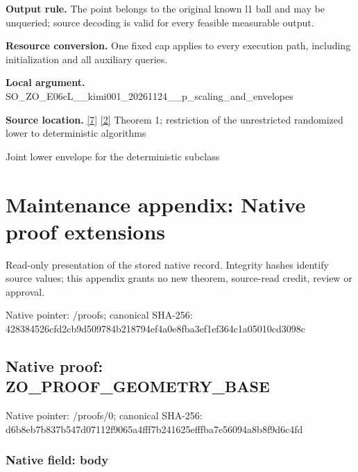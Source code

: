 \documentclass[10pt,a4paper]{article}
\begin{document}
\textbf{Output rule.} The point belongs to the original known l1 ball and may be unqueried; source decoding is valid for every feasible measurable output.



\textbf{Resource conversion.} One fixed cap applies to every execution path, including initialization and all auxiliary queries.



\textbf{Local argument.} SO\_ZO\_E06cL\_\_kimi001\_202\allowbreak{}61124\_\_p\_scaling\_and\_env\allowbreak{}elopes



\textbf{Source location.} \href{https://github.com/WU-Wendao/Colombo/blob/main/colombo_sensorium/Complexity_altas/data/sources/colombo/COLOMBO_KIMI_001/kimi_001.pdf}{[7]} \href{https://arxiv.org/html/2607.16558v2}{[2]} Theorem 1; restriction of the unrestricted randomized lower to deterministic algorithms



Joint lower envelope for the deterministic subclass



\section{Maintenance appendix: Native proof extensions}


Read-only presentation of the stored native record. Integrity hashes identify source values; this appendix grants no new theorem, source-read credit, review or approval.



Native pointer: /proofs; canonical SHA-256: 428384526cfd2cb9d509784b\allowbreak{}218794ef4a0e8fba3ef1ef36\allowbreak{}4c1a05010cd3098c



\subsection{Native proof: ZO\_PROOF\_GEOMETRY\_BASE}


Native pointer: /proofs/0; canonical SHA-256: d6b8eb7b837b547d07112f90\allowbreak{}65a4fff7b241625efffba7e5\allowbreak{}6094a8b8f9d6c4fd



\subsubsection{Native field: body}
\end{document}
